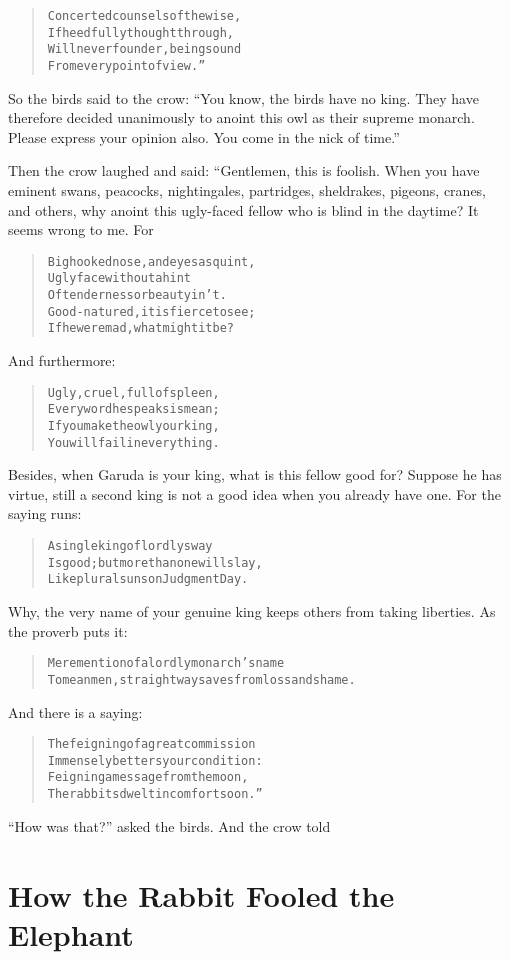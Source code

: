 \documentclass[article, twoside, 14pt]{memoir}
\renewenvironment{verbatim}{%
\begin{quote}%
\vskip -10pt%
\begin{alltt}\normalfont\large}{\end{alltt}%
\end{quote}%
\vskip -10pt
} %
\begin{document}
\begin{verbatim}
Concerted counsels of the wise,
    If heedfully thought through,
Will never founder, being sound
    From every point of view.”
\end{verbatim}
So the birds said to the crow:
``You know, the birds have no king. They have therefore decided unanimously to anoint this owl as their supreme monarch. Please express your opinion also. You come in the nick of time.''

Then the crow laughed and said: “Gentlemen, this is foolish. When
you have eminent swans, peacocks, nightingales, partridges,
sheldrakes, pigeons, cranes, and others, why anoint this ugly-faced
fellow who is blind in the daytime? It seems wrong to me. For

\begin{verbatim}
Big hooked nose, and eyes asquint,
Ugly face without a hint
Of tenderness or beauty in 't.
Good-natured, it is fierce to see;
If he were mad, what might it be?
\end{verbatim}
And furthermore:

\begin{verbatim}
Ugly, cruel, full of spleen,
Every word he speaks is mean;
If you make the owl your king,
You will fail in everything.
\end{verbatim}
Besides, when Garuda is your king, what is this fellow good for?
Suppose he has virtue, still a second king is not a good idea when
you already have one. For the saying runs:

\begin{verbatim}
A single king of lordly sway
Is good; but more than one will slay,
Like plural suns on Judgment Day.
\end{verbatim}
Why, the very name of your genuine king keeps others from taking
liberties. As the proverb puts it:

\begin{verbatim}
Mere mention of a lordly monarch's name
To mean men, straightway saves from loss and shame.
\end{verbatim}
And there is a saying:

\begin{verbatim}
The feigning of a great commission
Immensely betters your condition:
Feigning a message from the moon,
The rabbits dwelt in comfort soon.”
\end{verbatim}
``How was that?'' asked the birds. And the crow told

\chapter{How the Rabbit Fooled the Elephant}
\end{document}
